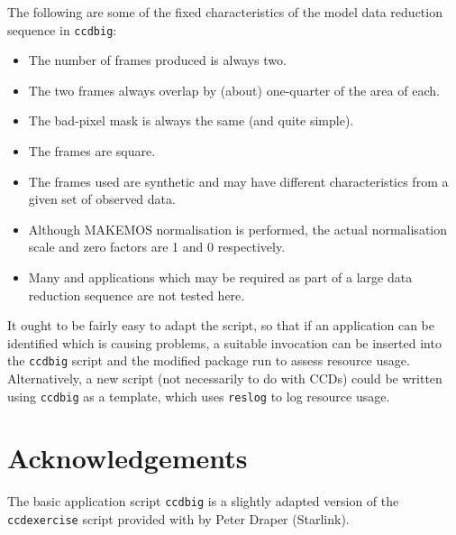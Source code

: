 The following are some of the fixed characteristics 
of the model data reduction sequence in {\tt ccdbig}:
\begin{itemize}
\item
The number of frames produced is always two.
\item
The two frames always overlap by (about)
one-quarter of the area of each.
\item
The bad-pixel mask is always the same (and quite simple).
\item
The frames are square.
\item
The frames used are synthetic and may have different 
characteristics from a given set of observed data.
\item
Although MAKEMOS normalisation is performed, the actual normalisation
scale and zero factors are 1 and 0 respectively.
\item
Many {\KAPPAref} and {\CCDPref} applications 
which may be required as
part of a large data reduction sequence are not tested here.
\end{itemize}


It ought to be fairly easy to adapt the script,
so that if an application
can be identified which 
is causing problems,
a suitable invocation can be inserted into the 
{\tt ccdbig} script and the modified package run to assess
resource usage.
Alternatively, a new script (not necessarily to do with CCDs) 
could be written using {\tt ccdbig} as a template,
which uses {\tt reslog} to log resource usage.


\section{Acknowledgements}

The basic application script {\tt ccdbig}
is a slightly adapted version of the {\tt ccdexercise} script
provided with {\CCDPref} by Peter Draper (Starlink).






